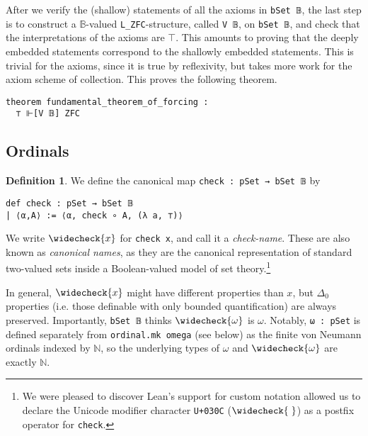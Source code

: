 \documentclass[sigplan,10pt,review]{acmart}
\newcommand{\lil}{\lstinline}
\newcommand{\N}{\mathbb{N}}
\theoremstyle{definition}
\newtheorem{defn}{Definition}[section]
\begin{document}
After we verify the (shallow) statements of all the axioms in \lil{bSet 𝔹}, the last step is to construct a \(\mathbb{B}\)-valued \lil{L_ZFC}-structure, called \lil{V 𝔹}, on \lil{bSet 𝔹}, and check that the interpretations of the axioms are \(\top\). This amounts to proving that the deeply embedded statements correspond to the shallowly embedded statements. This is trivial for the axioms, since it is true by reflexivity, but takes more work for the axiom scheme of collection. This proves the following theorem.
\begin{lstlisting}
theorem fundamental_theorem_of_forcing :
  ⊤ ⊩[V 𝔹] ZFC
\end{lstlisting}
\subsection{Ordinals}
\begin{defn}\label{def:check}
  We define the canonical map \lil{check : pSet → bSet 𝔹} by
  \begin{lstlisting}
def check : pSet → bSet 𝔹
| ⟨α,A⟩ := ⟨α, check ∘ A, (λ a, ⊤)⟩
  \end{lstlisting}
  We write $\widecheck{x}$ for \lil{check x}, and call it a \emph{check-name}.
  These are also known as \emph{canonical names}, as they are the canonical representation of standard two-valued sets inside a Boolean-valued model of set theory.\footnote{We were pleased to discover Lean's support for custom notation allowed us to declare the Unicode modifier character \texttt{U+030C} ($\widecheck{\hspace{1mm}}$) as a postfix operator for \texttt{check}.}
\end{defn}

In general, $\widecheck{x}$ might have different properties than $x$, but \(\Delta_0\) properties (i.e. those definable with only bounded quantification) are always preserved. Importantly, \lil{bSet 𝔹} thinks $\widecheck{\omega}$ is $\omega$. Notably, \lil{ω : pSet} is defined separately from \lil{ordinal.mk omega} (see below) as the finite von Neumann ordinals indexed by $\mathbb{N}$, so the underlying types of \(\omega\) and \(\widecheck{\omega}\) are exactly \(\N\). %
\end{document}
